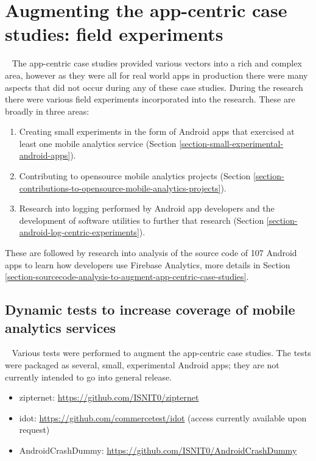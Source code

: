 

\section{Augmenting the app-centric case studies: field experiments}~\label{section-field-experiments-to-augment-app-centric-case-studies}
The app-centric case studies provided various vectors into a rich and complex area, however as they were all for real world apps in production there were many aspects that did not occur during any of these case studies. During the research there were various field experiments incorporated into the research. These are broadly in three areas:

\begin{enumerate}
    \itemsep0em
    \item Creating small experiments in the form of Android apps that exercised at least one mobile analytics service (Section \ref{section-small-experimental-android-apps}).
    \item Contributing to opensource mobile analytics projects (Section \ref{section-contributions-to-opensource-mobile-analytics-projects}).
    \item Research into logging performed by Android app developers and the development of software utilities to further that research (Section \ref{section-android-log-centric-experiments}). 
\end{enumerate}

These are followed by research into analysis of the source code of 107 Android apps to learn how developers use Firebase Analytics, more details in Section \ref{section-sourcecode-analysis-to-augment-app-centric-case-studies}.

\subsection{Dynamic tests to increase coverage of mobile analytics services}~\label{section-small-experimental-android-apps}
Various tests were performed to augment the app-centric case studies. The tests were packaged as several, small, experimental Android apps; they are not currently intended to go into general release.

\begin{itemize}
    \itemsep0em
    \item zipternet: \url{https://github.com/ISNIT0/zipternet}
    \item idot: \url{https://github.com/commercetest/idot} (access currently available upon request)
    \item AndroidCrashDummy: \url{https://github.com/ISNIT0/AndroidCrashDummy}
\end{itemize}

